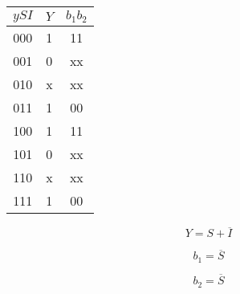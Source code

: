 \documentclass[10pt,a4paper]{article}
\begin{document}
\begin{multicols}{2}

\begin{tabular}{c|c|c}
$ySI$ & $Y$ & $b_1b_2$ \\ 
\hline 
000 & 1 & 11  \\ 
\hline 
001 & 0 & xx  \\ 
\hline 
010 & x & xx  \\ 
\hline 
011 & 1 & 00  \\ 
\hline 
100 & 1 & 11  \\ 
\hline 
101 & 0 & xx  \\ 
\hline 
110 & x & xx  \\ 
\hline 
111 & 1 & 00  \\ 
\end{tabular} 

\[
Y = S + \overline{I}
\]

\[
b_1 = \overline{S}
\]

\[
b_2 = \overline{S}
\]


\end{multicols}
\end{document}
